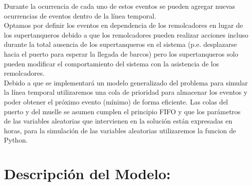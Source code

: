 \documentclass[titlepage,11pt]{scrartcl}
\begin{document}
    Durante la ocurrencia de cada uno de estos eventos se pueden agregar nuevas ocurrencias de eventos dentro de la l\'inea temporal.\\
    Optamos por definir los eventos en dependencia de los remolcadores en lugar de los supertanqueros debido a que los remolcadores pueden realizar acciones incluso
    durante la total ausencia de los supertanqueros en el sistema (p.e. desplazarse hacia el puerto para esperar la llegada de barcos) pero los supertanqueros solo pueden modificar el comportamiento del
    sistema con la asistencia de los remolcadores.\\
    Debido a que se implementar\'a un modelo generalizado del problema para simular la l\'inea temporal utilizaremos una cola de prioridad
    para almacenar los eventos y poder obtener el pr\'oximo evento (m\'inimo) de forma eficiente. Las colas del puerto y del muelle se asumen cumplen el principio FIFO y que los par\'ametros de
    las variables aleatorias que intervienen en la soluci\'on est\'an expresadas en horas, para la simulaci\'on de las variables aleatorias utilizaremos la funcion  de Python.


\section{Descripci\'on del Modelo:}
\end{document}
